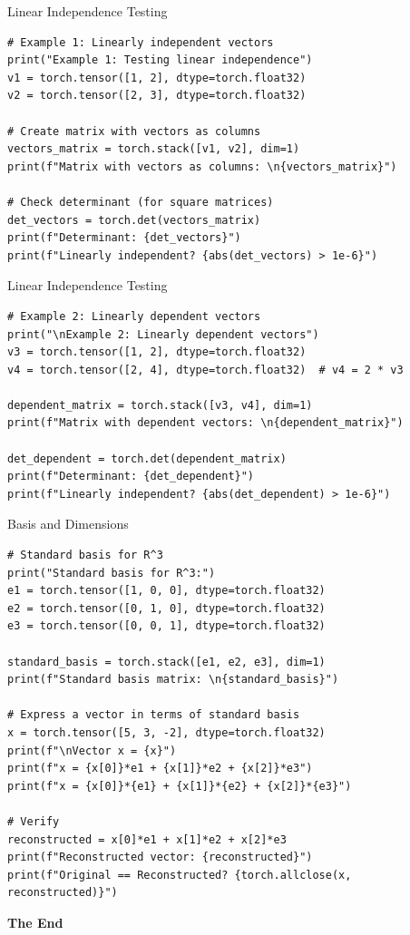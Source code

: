 \documentclass[aspectratio=169,xcolor=dvipsnames,svgnames,x11names,fleqn]{beamer}
\begin{document}
\begin{frame}[containsverbatim]{Linear Independence Testing}
\begin{verbatim}
# Example 1: Linearly independent vectors
print("Example 1: Testing linear independence")
v1 = torch.tensor([1, 2], dtype=torch.float32)
v2 = torch.tensor([2, 3], dtype=torch.float32)

# Create matrix with vectors as columns
vectors_matrix = torch.stack([v1, v2], dim=1)
print(f"Matrix with vectors as columns: \n{vectors_matrix}")

# Check determinant (for square matrices)
det_vectors = torch.det(vectors_matrix)
print(f"Determinant: {det_vectors}")
print(f"Linearly independent? {abs(det_vectors) > 1e-6}")
\end{verbatim}
\end{frame}


\begin{frame}[containsverbatim]{Linear Independence Testing}
\begin{verbatim}
# Example 2: Linearly dependent vectors
print("\nExample 2: Linearly dependent vectors")
v3 = torch.tensor([1, 2], dtype=torch.float32)
v4 = torch.tensor([2, 4], dtype=torch.float32)  # v4 = 2 * v3

dependent_matrix = torch.stack([v3, v4], dim=1)
print(f"Matrix with dependent vectors: \n{dependent_matrix}")

det_dependent = torch.det(dependent_matrix)
print(f"Determinant: {det_dependent}")
print(f"Linearly independent? {abs(det_dependent) > 1e-6}")
\end{verbatim}
\end{frame}


\begin{frame}[containsverbatim]{Basis and Dimensions}
\begin{verbatim}
# Standard basis for R^3
print("Standard basis for R^3:")
e1 = torch.tensor([1, 0, 0], dtype=torch.float32)
e2 = torch.tensor([0, 1, 0], dtype=torch.float32)
e3 = torch.tensor([0, 0, 1], dtype=torch.float32)

standard_basis = torch.stack([e1, e2, e3], dim=1)
print(f"Standard basis matrix: \n{standard_basis}")

# Express a vector in terms of standard basis
x = torch.tensor([5, 3, -2], dtype=torch.float32)
print(f"\nVector x = {x}")
print(f"x = {x[0]}*e1 + {x[1]}*e2 + {x[2]}*e3")
print(f"x = {x[0]}*{e1} + {x[1]}*{e2} + {x[2]}*{e3}")

# Verify
reconstructed = x[0]*e1 + x[1]*e2 + x[2]*e3
print(f"Reconstructed vector: {reconstructed}")
print(f"Original == Reconstructed? {torch.allclose(x, reconstructed)}")

\end{verbatim}
\end{frame}


\begin{frame}
    \Huge{\centerline{\color{bubblegumPink}\textbf{The End}}}
\end{frame}
\end{document}
